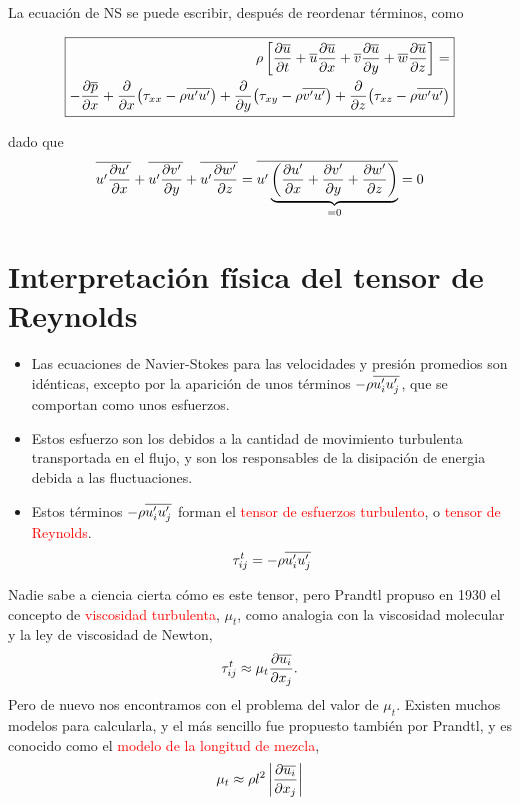 \bigskip
	
	La ecuación de NS se puede escribir, después de reordenar términos,
	como
	
	\[
	\boxed{{\begin{split}\rho\left[\frac{\partial \overline{u}}{\partial t}+\overline{u}\frac{\partial \overline{u}}{\partial x}+\overline{v}\frac{\partial \overline{u}}{\partial y}+\overline{w}\frac{\partial \overline{u}}{\partial z}\right]=\\
				-\frac{\partial \overline{p}}{\partial x}+\frac{\partial }{\partial x}\bigl(\tau_{xx}-\rho\overline{u'u'}\bigr)+\frac{\partial }{\partial y}\bigl(\tau_{xy}-\rho\overline{v'u'}\bigr)+\frac{\partial }{\partial z}\bigl(\tau_{xz}-\rho\overline{w'u'}\bigr)
			\end{split}
	}}
	\]
	
	dado que 
	\[
	\overline{u'\frac{\partial u'}{\partial x}}+\overline{u'\frac{\partial v'}{\partial y}}+\overline{u'\frac{\partial w'}{\partial z}}=\overline{u'\underbrace{\left(\frac{\partial u'}{\partial x}+\frac{\partial v'}{\partial y}+\frac{\partial w'}{\partial z}\right)}_{=0}}=0
	\]
	

\section{Interpretación física del tensor de Reynolds}

	
	\begin{itemize}
		\item Las ecuaciones de Navier-Stokes para las velocidades y presión promedios
		son idénticas, excepto por la aparición de unos términos $-\rho\overline{u_{i}'u_{j}'}$,
		que se comportan como unos esfuerzos.
		\item Estos esfuerzo son los debidos a la cantidad de movimiento turbulenta
		transportada en el flujo, y son los responsables de la disipación
		de energia debida a las fluctuaciones.
		\item Estos términos $-\rho\overline{u_{i}'u_{j}'}$ forman el \textcolor{red}{tensor
			de esfuerzos turbulento}, o \textcolor{red}{tensor de Reynolds}. 
		\[
		\tau_{ij}^{t}=-\rho\overline{u_{i}'u_{j}'}
		\]
	\end{itemize}

	
	Nadie sabe a ciencia cierta cómo es este tensor, pero Prandtl propuso
	en 1930 el concepto de \textcolor{red}{viscosidad turbulenta}, $\mu_{t}$,
	como analogia con la viscosidad molecular y la ley de viscosidad de
	Newton, 
	\[
	\tau_{ij}^{t}\approx\mu_{t}\frac{\partial \overline{u_{i}}}{\partial x_{j}}.
	\]
	Pero de nuevo nos encontramos con el problema del valor de $\mu_{t}$.
	Existen muchos modelos para calcularla, y el más sencillo fue propuesto
	también por Prandtl, y es conocido como el \textcolor{red}{modelo
		de la longitud de mezcla}, 
	\[
	\mu_{t}\approx\rho l^{2}\left|\frac{\partial \overline{u_{i}}}{\partial x_{j}}\right|
	\]
	
